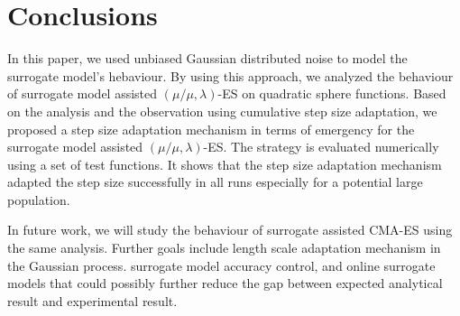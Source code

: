 







\section{Conclusions}
In this paper, we used unbiased Gaussian distributed noise to model the surrogate model's hebaviour. By using this approach, we analyzed the behaviour of surrogate model assisted $(\mu/\mu,\lambda)$-ES on quadratic sphere functions. Based on the analysis and the observation using cumulative step size adaptation, we proposed a step size adaptation mechanism in terms of emergency for the surrogate model assisted $(\mu/\mu,\lambda)$-ES. The strategy is evaluated numerically using a set of test functions. It shows that the step size adaptation mechanism adapted the step size successfully in all runs especially for a potential large population.

In future work, we will study the behaviour of surrogate assisted CMA-ES using the same analysis. Further goals include length scale adaptation mechanism in the Gaussian process. surrogate model accuracy control, and online surrogate models that could possibly further reduce the gap between expected analytical result and experimental result. 








